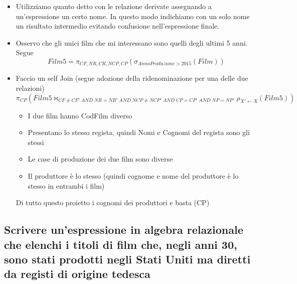 \begin{itemize}
	\item Utilizziamo quanto detto con le relazione derivate assegnando a un'espressione un certo nome. In questo modo indichiamo con un solo nome un risultato intermedio evitando confusione nell'espressione finale.
	\item Osservo che gli unici film che mi interessano sono quelli degli ultimi 5 anni. Segue
	\[Film5 = \pi_{CF,NR,CR,NCP,CP}(\sigma_{AnnoProduzione > 2015}(Film))\]
	\item Faccio un self Join (segue adozione della ridenominazione per una delle due relazioni)
	\[ \pi_{CP}(Film5 \Join_{CF \neq CF'\;AND\;NR=NR'\;AND\;NCP\neq NCP'\;AND\;CP=CP'\;AND\;NP = NP'} \rho_{X' \longleftarrow X}(Film5))\]
	\begin{itemize}
		\item I due film hanno CodFilm diverso
		\item Presentano lo stesso regista, quindi Nomi e Cognomi del regista sono gli stessi
		\item Le case di produzione dei due film sono diverse
		\item Il produttore è lo stesso (quindi cognome e nome del produttore è lo stesso in entrambi i film)
	\end{itemize}
	Di tutto questo proietto i cognomi dei produttori e basta (CP)
\end{itemize}

\subsection*{Scrivere un'espressione in algebra relazionale che elenchi i titoli di film che, negli anni 30, sono stati prodotti negli Stati Uniti ma diretti da registi di origine tedesca}


